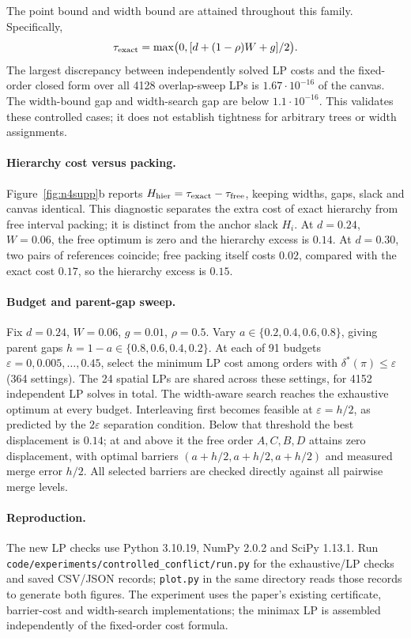 \documentclass[10pt]{article}
\begin{document}
The point bound and width bound are attained throughout this family. Specifically,
\[
\tau_{\rm exact}=\max\bigl(0,[d+(1-\rho)W+g]/2\bigr).
\]
The largest discrepancy between independently solved LP costs and the fixed-order closed form over all 4128 overlap-sweep LPs is $1.67\cdot10^{-16}$ of the canvas. The width-bound gap and width-search gap are below $1.1\cdot10^{-16}$. This validates these controlled cases; it does not establish tightness for arbitrary trees or width assignments.

\paragraph{Hierarchy cost versus packing.} Figure~\ref{fig:n4supp}b reports $H_{\rm hier}=\tau_{\rm exact}-\tau_{\rm free}$, keeping widths, gaps, slack and canvas identical. This diagnostic separates the extra cost of exact hierarchy from free interval packing; it is distinct from the anchor slack $H_i$. At $d=0.24$, $W=0.06$, the free optimum is zero and the hierarchy excess is $0.14$. At $d=0.30$, two pairs of references coincide; free packing itself costs $0.02$, compared with the exact cost $0.17$, so the hierarchy excess is $0.15$.

\paragraph{Budget and parent-gap sweep.} Fix $d=0.24$, $W=0.06$, $g=0.01$, $\rho=0.5$. Vary $a\in\{0.2,0.4,0.6,0.8\}$, giving parent gaps $h=1-a\in\{0.8,0.6,0.4,0.2\}$. At each of 91 budgets $\varepsilon=0,0.005,\ldots,0.45$, select the minimum LP cost among orders with $\delta^*(\pi)\le\varepsilon$ (364 settings). The 24 spatial LPs are shared across these settings, for 4152 independent LP solves in total. The width-aware search reaches the exhaustive optimum at every budget. Interleaving first becomes feasible at $\varepsilon=h/2$, as predicted by the $2\varepsilon$ separation condition. Below that threshold the best displacement is $0.14$; at and above it the free order $A,C,B,D$ attains zero displacement, with optimal barriers $(a+h/2,a+h/2,a+h/2)$ and measured merge error $h/2$. All selected barriers are checked directly against all pairwise merge levels.



\paragraph{Reproduction.} The new LP checks use Python 3.10.19, NumPy 2.0.2 and SciPy 1.13.1. Run \nolinkurl{code/experiments/controlled_conflict/run.py} for the exhaustive/LP checks and saved CSV/JSON records; \texttt{plot.py} in the same directory reads those records to generate both figures. The experiment uses the paper's existing certificate, barrier-cost and width-search implementations; the minimax LP is assembled independently of the fixed-order cost formula.
\end{document}
